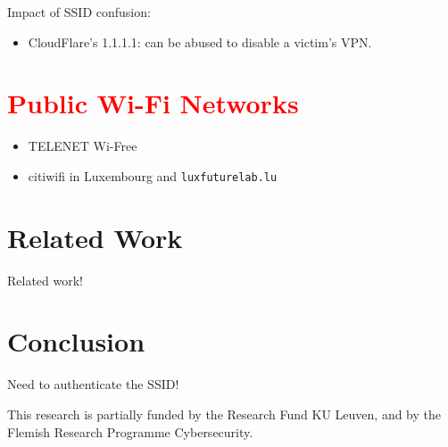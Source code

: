 \documentclass[sigconf,review]{acmart}
\newcommand{\wifi}{\mbox{Wi-Fi}}
\DeclareRobustCommand{\red}[1]{\textcolor{red}{#1}}
\begin{document}
Impact of SSID confusion:
\begin{itemize}
	\item CloudFlare's 1.1.1.1: can be abused to disable a victim's VPN.
\end{itemize}

\section{\red{Public \wifi{} Networks}}

\begin{itemize}
	\item TELENET Wi-Free
	\item citiwifi in Luxembourg and \verb|luxfuturelab.lu|
\end{itemize}

\section{Related Work}
\label{sec:relatedwork}

Related work!

\section{Conclusion}
\label{sec:conclusion}

Need to authenticate the SSID!

\begin{acks}
This research is partially funded by the Research Fund KU Leuven, and by the Flemish Research Programme Cybersecurity.
\end{acks}




\end{document}
